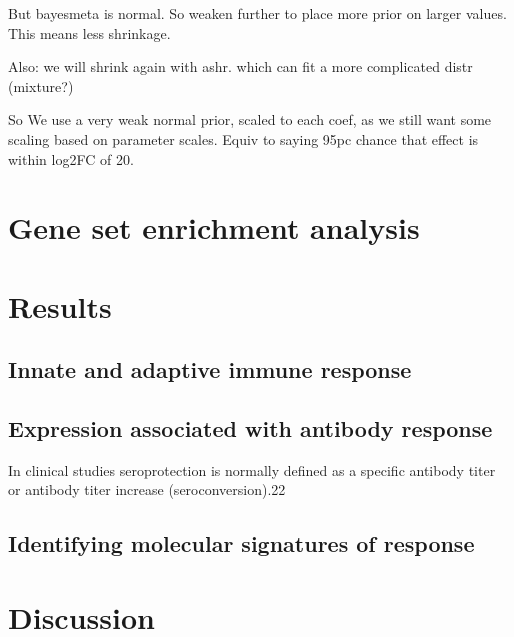 But bayesmeta is normal. So weaken further to place more prior on larger values.
This means less shrinkage.

Also: we will shrink again with ashr. 
which can fit a more complicated distr (mixture?)

So We use a very weak normal prior, scaled to each coef, as we still want some scaling based on parameter scales.
Equiv to saying 95pc chance that effect is within log2FC of 20.


\section{Gene set enrichment analysis}

\section{Results}

\subsection{Innate and adaptive immune response}

\subsection{Expression associated with antibody response}

In clinical studies seroprotection is normally defined as a specific antibody titer or antibody titer increase (seroconversion).22

\subsection{Identifying molecular signatures of response}

\section{Discussion}

